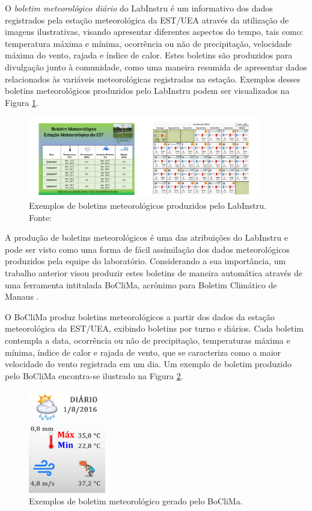 O \emph{boletim meteorológico diário} do LabInstru é um informativo dos dados registrados pela estação meteorológica da EST/UEA através da utilização de imagens ilustrativas, visando apresentar diferentes aspectos do tempo, tais como: temperatura máxima e mínima, ocorrência ou não de precipitação, velocidade máxima do vento, rajada e índice de calor. Estes boletins são produzidos para divulgação junto à comunidade, como uma maneira resumida de apresentar dados relacionados às variáveis meteorológicas registradas na estação. Exemplos desses boletins meteorológicos produzidos pelo LabInstru podem ser visualizados na Figura \ref{fig:bm}.

\begin{figure}[h!]
	\centering
	\includegraphics[width=0.9\textwidth]{./img/bm.png}
	\caption{Exemplos de boletins meteorológicos produzidos pelo LabInstru. Fonte: \cite{Labinstru:EST}} \label{fig:bm}
\end{figure}

A produção de boletins meteorológicos é uma das atribuições do LabInstru e pode ser visto como uma forma de fácil assimilação dos dados meteorológicos produzidos pela equipe do laboratório. Considerando a sua importância, um trabalho anterior visou produzir estes boletins de maneira automática através de uma ferramenta intitulada BoCliMa, acrônimo para Boletim Climático de Manaus \cite{Lima:Artigo}.

O BoCliMa produz boletins meteorológicos a partir dos dados da estação meteorológica da EST/UEA, exibindo boletins por turno e diários. Cada boletim contempla a data, ocorrência ou não de precipitação, temperaturas máxima e mínima, índice de calor e rajada de vento, que se caracteriza como a maior velocidade do vento registrada em um dia. Um exemplo de boletim produzido pelo BoCliMa encontra-se ilustrado na Figura \ref{fig:boclima}.

\begin{figure}[h!]
	\centering
	\includegraphics[width=0.3\textwidth]{./img/boclima}
	\caption{Exemplos de boletim meteorológico gerado pelo BoCliMa. } \label{fig:boclima}
\end{figure}

